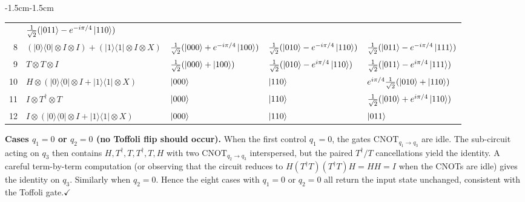 \documentclass{ceri/sty/rapport}
\begin{document}
\begin{adjustwidth}{-1.5cm}{-1.5cm}
\begin{solution}
{\begin{footnotesize}
\begin{tabular}{@{}r@{\;}l@{\quad}l@{\quad}l@{\quad}l@{}}
   & $\tfrac{1}{\sqrt{2}}(\ket{011}-e^{-i\pi/4}\ket{110})$ \\[3pt]
8  & $(|0\rangle\langle0|\!\otimes\! I\!\otimes\! I)+(|1\rangle\langle1|\!\otimes\! I\!\otimes\! X)$
   & $\tfrac{1}{\sqrt{2}}(\ket{000}+e^{-i\pi/4}\ket{100})$
   & $\tfrac{1}{\sqrt{2}}(\ket{010}-e^{-i\pi/4}\ket{110})$
   & $\tfrac{1}{\sqrt{2}}(\ket{011}-e^{-i\pi/4}\ket{111})$ \\[3pt]
9  & $T \otimes T \otimes I$
   & $\tfrac{1}{\sqrt{2}}(\ket{000}+\ket{100})$
   & $\tfrac{1}{\sqrt{2}}(\ket{010}-e^{i\pi/4}\ket{110})$
   & $\tfrac{1}{\sqrt{2}}(\ket{011}-e^{i\pi/4}\ket{111})$ \\[3pt]
10 & $H\!\otimes\!(|0\rangle\langle0|\!\otimes\! I+|1\rangle\langle1|\!\otimes\! X)$
   & $\ket{000}$
   & $\ket{110}$
   & $e^{i\pi/4}\tfrac{1}{\sqrt{2}}(\ket{010}+\ket{110})$ \\[3pt]
11 & $I \otimes T^\dagger \otimes T$
   & $\ket{000}$
   & $\ket{110}$
   & $\tfrac{1}{\sqrt{2}}(\ket{010}+e^{i\pi/4}\ket{110})$ \\[3pt]
12 & $I\!\otimes\!(|0\rangle\langle0|\!\otimes\! I+|1\rangle\langle1|\!\otimes\! X)$
   & $\ket{000}$
   & $\ket{110}$
   & $\ket{011}$ \\
\bottomrule
\end{tabular}%
\end{footnotesize}}%



\medskip\noindent
\textbf{Cases $q_1=0$ or $q_2=0$ (no Toffoli flip should occur).}
When the first control $q_1=0$, the gates $\mathrm{CNOT}_{q_1\to q_3}$ are idle.
The sub-circuit acting on $q_3$ then contains $H,T^\dagger,T,T^\dagger,T,H$ with two
$\mathrm{CNOT}_{q_2\to q_3}$ interspersed, but the paired $T^\dagger/T$ cancellations yield the identity.
A careful term-by-term computation (or observing that the circuit reduces to
$H(T^\dagger T)(T^\dagger T)H=HH=I$ when the CNOTs are idle) gives the identity on $q_3$.
Similarly when $q_2=0$.  Hence the eight cases with $q_1=0$ or $q_2=0$ all return the
input state unchanged, consistent with the Toffoli gate.\quad$\checkmark$


\end{solution}
\end{adjustwidth}
\end{document}
